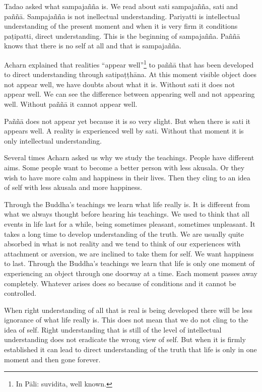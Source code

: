 \documentclass{book}
\begin{document}
Tadao asked what sampajañña is. We read
about sati sampajañña, sati and paññā. Sampajañña is not inellectual
understanding. Pariyatti is intellectual understanding of the present
moment and when it is very firm it conditions paṭipatti, direct
understanding. This is the beginning of sampajañña. Paññā knows that
there is no self at all and that is sampajañña.

Acharn explained that realities ``appear
well''\footnote{In
Pāli: suvidita, well known. } to
paññā that has been developed to direct understanding through
satipaṭṭhāna. At this moment visible object does not appear well, we
have doubts about what it is. Without sati it does not appear well. We
can see the difference between appearing well and not appearing well.
Without paññā it cannot appear well. 

Paññā does not appear yet because it is so
very slight. But when there is sati it appears well. A reality is
experienced well by sati. Without that moment it is only intellectual
understanding. 

Several times Acharn asked us why we study
the teachings. People have different aims. Some people want to become a
better person with less akusala. Or they wish to have more calm and
happiness in their lives. Then they cling to an idea of self with less
akusala and more happiness. 

Through the Buddha's teachings we learn what
life really is. It is different from what we always thought before
hearing his teachings. We used to think that all events in life last for
a while, being sometimes pleasant, sometimes unpleasant. It takes a long
time to develop understanding of the truth. We are usually quite
absorbed in what is not reality and we tend to think of our experiences
with attachment or aversion, we are inclined to take them for self. We
want happiness to last. Through the Buddha's teachings we learn that
life is only one moment of experiencing an object through one doorway at
a time. Each moment passes away completely. Whatever arises does so
because of conditions and it cannot be controlled. 

When right understanding of all that is real
is being developed there will be less ignorance of what life really is.
This does not mean that we do not cling to the idea of self. Right
understanding that is still of the level of intellectual understanding
does not eradicate the wrong view of self. But when it is firmly
established it can lead to direct understanding of the truth that life
is only in one moment and then gone forever.
\end{document}
